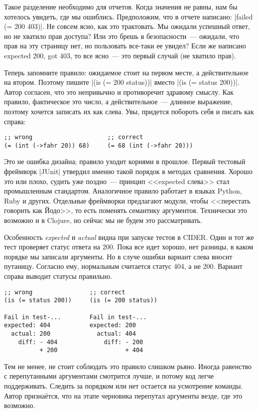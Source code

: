 Такое разделение необходимо для отчетов. Когда значения не равны, нам бы
хотелось увидеть, где мы ошиблись. Предположим, что в отчете написано:
\spverb|failed (= 200 403)|. Не совсем ясно, как это трактовать. Мы ожидали
успешный ответ, но не хватило прав доступа? Или это брешь в безопасности~---
ожидали, что прав на эту страницу нет, но пользовать все-таки ее увидел? Если же
написано expected 200, got 403, то все ясно~--- это первый случай (не хватило
прав).

Теперь запомните правило: ожидаемое стоит на первом месте, а действительное на
втором. Поэтому пишите \spverb|(is (= 200 status))| вместо \spverb|(is (= status 200))|. Автор
согласен, что это непривычно и противоречит здравому смыслу. Как правило,
фактическое это число, а действительное~--- длинное выражение, поэтому хочется
записать их как слева. Увы, придется побороть себя и писать как справа:

\begin{verbatim}
;; wrong                     ;; correct
(= (int (->fahr 20)) 68)     (= 68 (int (->fahr 20)))
\end{verbatim}

Это не ошибка дизайна; правило уходит корнями в прошлое. Первый тестовый
фреймворк \spverb|JUnit| утвердил именно такой порядок в методах сравнения. Хорошо это
или плохо, судить уже поздно~--- принцип <<expected слева>> стал промышленным
стандартом. Аналогичное правило работает в языках Python, Ruby и
других. Отдельные фреймворки предлагают модули, чтобы <<перестать говорить как
Йодо>>, то есть поменять семантику аргументов. Технически это возможно и в
Clojure, но сейчас мы не будем это рассматривать.

Особенность \emph{expected} и \emph{actual} видна при запуске тестов в
CIDER. Один и тот же тест проверяет статус ответа на 200. Пока все идет хорошо,
нет разницы, в каком порядке мы записали аргументы. Но в случе ошибки вариант
слева вносит путаницу. Согласно ему, нормальным считается статус 404, а не
200. Вариант справа выводит статусы правильно.

\begin{verbatim}
;; wrong                ;; correct
(is (= status 200))     (is (= 200 status))

Fail in test-...        Fail in test-...
expected: 404           expected: 200
  actual: 200             actual: 404
    diff: - 404             diff: - 200
          + 200                   + 404
\end{verbatim}

Тем не менее, не стоит соблюдать это правило слишком рьяно. Иногда равенство с
перепутанными аргументами смотрится лучше, и потому код легче
поддерживать. Следить за порядком или нет остается на усмотрение команды. Автор
признаётся, что на этапе черновика перепутал аргументы везде, где это возможно.


